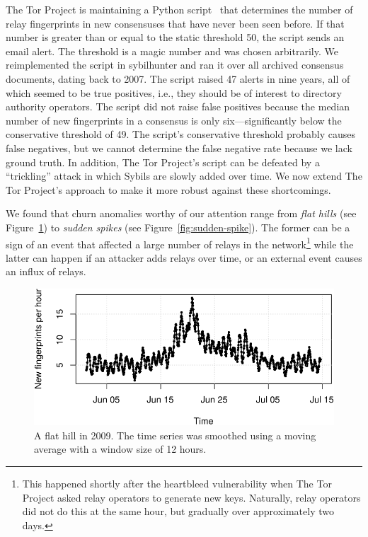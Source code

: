 The Tor Project is maintaining a Python script~\cite{doctor} that determines the
number of relay fingerprints in new consensuses that have never been seen
before.  If that number is greater than or equal to the static threshold 50, the
script sends an email alert.  The threshold is a magic number and was chosen
arbitrarily.  We reimplemented the script in sybilhunter and ran it over all
archived consensus documents, dating back to 2007.  The script raised 47 alerts
in nine years, all of which seemed to be true positives, i.e., they should be of
interest to directory authority operators.  The script did not raise false
positives because the median number of new fingerprints in a consensus is only
six---significantly below the conservative threshold of 49.  The script's
conservative threshold probably causes false negatives, but we cannot determine
the false negative rate because we lack ground truth.  In addition, The Tor
Project's script can be defeated by a ``trickling'' attack in which Sybils are
slowly added over time.  We now extend The Tor Project's approach to make it
more robust against these shortcomings.

We found that churn anomalies worthy of our attention range from \emph{flat
hills} (see Figure~\ref{fig:flat-hill}) to \emph{sudden spikes} (see
Figure~\ref{fig:sudden-spike}).  The former can be a sign of an event that
affected a large number of relays in the network\footnote{This happened shortly
after the heartbleed vulnerability when The Tor Project asked relay operators
to generate new keys.  Naturally, relay operators did not do this at the same
hour, but gradually over approximately two days.} while the latter can happen if
an attacker adds relays over time, or an external event causes an influx of
relays.

\begin{figure}[t]
	\centering
	\includegraphics[width=\linewidth]{diagrams/flat-hill.pdf}
	\caption{A flat hill in 2009.  The time series was smoothed using a moving
	average with a window size of 12 hours.}
	\label{fig:flat-hill}
\end{figure}

